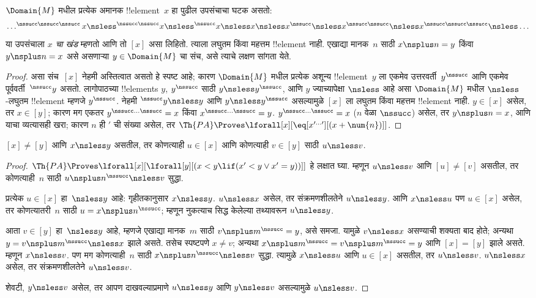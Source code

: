 \documentclass[../../../include/open-logic-section]{subfiles}
\begin{document}
\begin{prop}
$\Domain{M}$ मधील प्रत्येक अमानक !!{element}~$x$ हा पुढील उपसंचाचा घटक
असतो:
\[
\dots ^{\nssucc\nssucc\nssucc}x \nsless ^{\nssucc\nssucc}x \nsless
^{\nssucc}x \nsless x \nsless x^{\nssucc} \nsless x^{\nssucc\nssucc}
\nsless x^{\nssucc\nssucc\nssucc} \nsless \dots
\]
या उपसंचाला \emph{$x$ चा खंड} म्हणतो आणि तो $[x]$ असा लिहितो. त्याला
लघुतम किंवा महत्तम !!{element} नाही. एखाद्या मानक~$n$ साठी
$x \nsplus n = y$ किंवा $y \nsplus n = x$ असे असणाऱ्या
$y \in \Domain{M}$ चा संच, असे त्याचे लक्षण सांगता येते.
\end{prop}

\begin{proof}
असा संच~$[x]$ नेहमी अस्तित्वात असतो हे स्पष्ट आहे; कारण
$\Domain{M}$ मधील प्रत्येक अशून्य !!{element}~$y$ ला एकमेव
उत्तरवर्ती~$y^\nssucc$ आणि एकमेव पूर्ववर्ती~$^\nssucc y$ असतो. लागोपाठच्या
!!{element}s $y$, $y^\nssucc$ साठी $y \nsless y^\nssucc$, आणि
$y$ ज्याच्यापेक्षा $\nsless$ आहे असा $\Domain{M}$ मधील $\nsless$-लघुतम
!!{element} म्हणजे $y^\nssucc$. नेहमी $^\nssucc y \nsless y$ आणि
$y \nsless y^\nssucc$ असल्यामुळे $[x]$ ला लघुतम किंवा महत्तम !!{element}
नाही. $y \in [x]$ असेल, तर $x \in [y]$; कारण मग एकतर
$y^{\nssucc\dots\nssucc} = x$ किंवा $x^{\nssucc\dots\nssucc} = y$.
$y^{\nssucc\dots\nssucc} = x$ ($n$ वेळा $\nssucc$) असेल, तर
$y \nsplus n = x$, आणि याचा व्यत्यासही खरा; कारण $n$ ही $\prime$ ची
संख्या असेल, तर $\Th{PA} \Proves
\lforall[x][\eq[x^{\prime\dots\prime}][(x + \num{n})]]$.
\end{proof}

\begin{prop}
$[x] \neq [y]$ आणि $x \nsless y$ असतील, तर कोणत्याही $u \in [x]$ आणि
कोणत्याही $v \in [y]$ साठी $u \nsless v$.
\end{prop}

\begin{proof}
$\Th{PA} \Proves \lforall[x][\lforall[y][(x < y \lif (x' < y
    \lor x' = y))]]$ हे लक्षात घ्या. म्हणून $u \nsless v$ आणि
$[u] \neq [v]$ असतील, तर कोणत्याही~$n$ साठी
$u \nsplus n^\nssucc \nsless v$ सुद्धा.

प्रत्येक $u \in [x]$ हा~$\nsless y$ आहे: गृहीतकानुसार
$x \nsless y$. $u \nsless x$ असेल, तर संक्रमणशीलतेने $u \nsless y$.
आणि $x \nsless u$ पण $u \in [x]$ असेल, तर कोणत्यातरी~$n$ साठी
$u = x\nsplus n^\nssucc$; म्हणून नुकत्याच सिद्ध केलेल्या तथ्यावरून
$u \nsless y$.

आता $v \in [y]$ हा~$\nsless y$ आहे, म्हणजे एखाद्या मानक~$m$
साठी $v \nsplus m^\nssucc = y$, असे समजा. यामुळे $v \nsless x$ असण्याची
शक्यता बाद होते; अन्यथा $y = v \nsplus m^\nssucc \nsless x$ झाले असते.
तसेच स्पष्टपणे $x \neq v$; अन्यथा
$x \nsplus m^\nssucc = v \nsplus m^\nssucc = y$ आणि $[x] = [y]$ झाले
असते. म्हणून $x \nsless v$. पण मग कोणत्याही~$n$ साठी
$x \nsplus n^\nssucc \nsless v$ सुद्धा. त्यामुळे $x \nsless u$ आणि
$u \in [x]$ असतील, तर $u \nsless v$. $u \nsless x$ असेल, तर
संक्रमणशीलतेने $u \nsless v$.

शेवटी, $y \nsless v$ असेल, तर आपण दाखवल्याप्रमाणे $u \nsless y$ आणि
$y \nsless v$ असल्यामुळे $u \nsless v$.
\end{proof}
\end{document}

